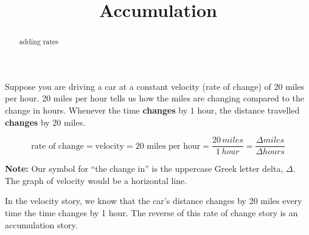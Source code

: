 \documentclass{ximera}
\title{Accumulation}
\begin{document}
\begin{abstract}
adding rates
\end{abstract}
\maketitle





Suppose you are driving a car at a constant velocity (rate of change) of 20 miles per hour. 20 miles per hour tells us how the miles are changing compared to the change in hours.  Whenever the time \textbf{\textcolor{purple!85!blue}{changes}} by $1$ hour, the distance travelled \textbf{\textcolor{purple!85!blue}{changes}} by $20$ miles.

\[
\text{rate of change} = \text{velocity} = \text{20 miles per hour} = \frac{20 \, miles}{1 \, hour} = \frac{\Delta miles}{\Delta hours}
\]

\textbf{Note:} Our symbol for ``the change in'' is the uppercase Greek letter delta, $\Delta$. \\

The graph of velocity would be a horizontal line.



\begin{image}
\end{image}

In the velocity story, we know that the car's distance changes by 20 miles every time the time changes by 1 hour.  The reverse of this rate of change story is an accumulation story.
\end{document}
